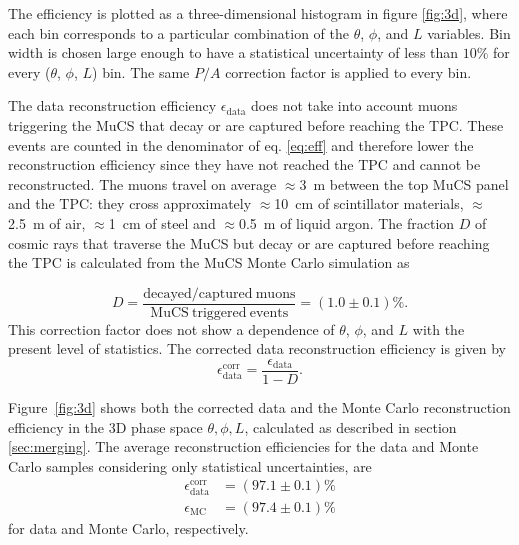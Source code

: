 \documentclass[a4paper,11pt]{article}
\begin{document}
The efficiency is plotted as a three-dimensional histogram in figure \ref{fig:3d}, where each bin corresponds to a particular combination of the $\theta$, $\phi$, and $L$ variables. Bin width is chosen large enough to have a statistical uncertainty of less than $10\%$ for every ($\theta$, $\phi$, $L$) bin. The same $P/A$ correction factor is applied to every bin.

The data reconstruction efficiency $\epsilon_{\mathrm{data}}$ does not take into account muons triggering the MuCS that decay or are captured before reaching the TPC. These events are counted in the denominator of eq. \eqref{eq:eff} and therefore lower the reconstruction efficiency since they have not reached the TPC and cannot be reconstructed. The muons travel on average $\approx3$~m between the top MuCS panel and the TPC: they cross approximately $\approx$10~cm of scintillator materials, $\approx$2.5~m of air, $\approx$1~cm of steel and $\approx$0.5~m of liquid argon. The fraction $D$ of cosmic rays that traverse the MuCS but decay or are captured before reaching the TPC is calculated from the MuCS Monte Carlo simulation as

\begin{equation}
D = \frac{\mathrm{decayed/captured~muons}}{\mathrm{MuCS~triggered~events}} = (1.0 \pm 0.1)\%.
\end{equation}
This correction factor does not show a dependence of $\theta$, $\phi$, and $L$ with the present level of statistics. The corrected data reconstruction efficiency is given by
\begin{equation}\label{eq:dcorr}
\epsilon_{\mathrm{data}}^{\mathrm{corr}} =  \frac{\epsilon_{\mathrm{data}}}{1-D}.
\end{equation}

Figure~\ref{fig:3d} shows both the corrected data and the Monte Carlo reconstruction efficiency in the 3D phase space $\theta, \phi, L$, calculated as described in section \ref{sec:merging}. The average reconstruction efficiencies for the data and Monte Carlo samples considering only statistical uncertainties, are
\begin{align}
\epsilon_{\mathrm{data}}^{\mathrm{corr}} &= (97.1 \pm 0.1)\%\\
\epsilon_{\mathrm{MC}} &= (97.4 \pm 0.1)\% \nonumber
\end{align}
for data and Monte Carlo, respectively.
\end{document}
